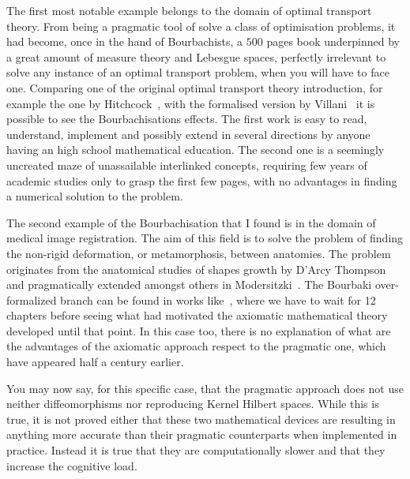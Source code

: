 \documentclass[]{scrartcl}
\theoremstyle{definition}
\begin{document}
The first most notable example belongs to the domain of optimal transport theory. From being a pragmatic tool of solve a class of optimisation problems, it had become, once in the hand of Bourbachists, a $500$ pages book underpinned by a great amount of measure theory and Lebesgue spaces, perfectly irrelevant to solve any instance of an optimal transport problem, when you will have to face one. Comparing one of the original optimal transport theory introduction, for example the one by Hitchcock~\cite{hitchcock1941distribution}, with the formalised version by Villani~\cite{villani2003topics} it is possible to see the Bourbachisations effects. The first work is easy to read, understand, implement and possibly extend in several directions by anyone having an high school mathematical education. The second one is a seemingly uncreated maze of unassailable interlinked concepts, requiring few years of academic studies only to grasp the first few pages, with no advantages in finding a numerical solution to the problem. %

The second example of the Bourbachisation that I found is in the domain of medical image registration. The aim of this field is to solve the problem of finding the non-rigid deformation, or metamorphosis, between anatomies. The problem originates from the anatomical studies of shapes growth by D'Arcy Thompson~\cite{d1942growth} and pragmatically extended amongst others in Modersitzki~\cite{modersitzki2004numerical}. The Bourbaki over-formalized branch can be found in works like~\cite{younes2010shapes}, where we have to wait for 12 chapters before seeing what had motivated the axiomatic mathematical theory developed until that point.
In this case too, there is no explanation of what are the advantages of the axiomatic approach respect to the pragmatic one, which have appeared half a century earlier.

You may now say, for this specific case, that the pragmatic approach \cite{modersitzki2004numerical} does not use neither diffeomorphisms nor reproducing Kernel Hilbert spaces. While this is true, it is not proved either that these two mathematical devices are resulting in anything more accurate than their pragmatic counterparts when implemented in practice. Instead it is true that they are computationally slower and that they increase the cognitive load.
\end{document}
